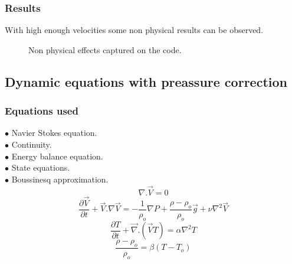 \documentclass[xcolor=dvipsnames,10pt,aspectratio=169]{beamer}
\begin{document}
\begin{frame}
	\frametitle{Results}

	\begin{minipage}[h!]{0.45\textwidth}
	 	With high enough velocities some non physical results can be observed.
	\end{minipage}\hfill
 	\begin{minipage}[h!]{0.5\textwidth}
	 	\begin{figure}
	 		\label{gif_gfort}
	 		\caption{Non physical effects captured on the code.}
	 	\end{figure}
	\end{minipage}
\end{frame}

\subsection{Dynamic equations with preassure correction}

\begin{frame}
	\frametitle{Equations used}
	\flushleft
	\quad $\bullet$ Navier Stokes equation.\\
	\quad $\bullet$ Continuity.\\
	\quad $\bullet$ Energy balance equation.\\
	\quad $\bullet$ State equations.\\
	\quad $\bullet$ Boussinesq approximation.\\

	\begin{equation}
	\nabla . \vec{V} = 0
	\end{equation}
	\begin{equation}
	\frac{\partial \vec{V}}{\partial t} +  \vec{V} . {\nabla} \vec{V}  =  -\frac{1}{\rho_o} {\nabla}P + \frac{\rho - \rho_o}{\rho_o} \vec{g} + \nu \nabla ^2 \vec{V}
	\end{equation}
	\begin{equation}
	\frac{\partial T}{\partial t} + \vec{\nabla} . \left( \vec{V}T \right) = \alpha \nabla^2T
	\end{equation}
	\begin{equation}
	\frac{\rho - \rho_o}{\rho_o} = \beta \left( T - T_o\right)
	\end{equation}
\end{frame}
\end{document}
